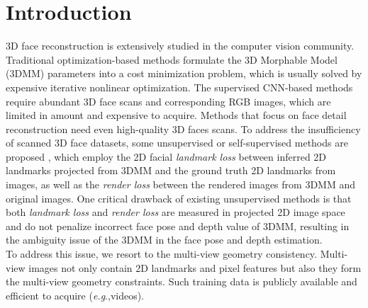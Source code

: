 \documentclass[runningheads]{llncs}
\newcommand{\eg}{\textit{e.g}.,}
\begin{document}
\section{Introduction}




3D face reconstruction is extensively studied in the computer vision community. Traditional optimization-based methods \cite{intro_relate_tra_romdhani2005estimating,intro_tra_aldrian2012inverse,intro_relate_tra_roth2015unconstrained,intro_tra_bas2016fitting, intro_tra_roth2016adaptive,intro_tra_cao2016real,intro_ava_hu2017avatar} formulate the 3D Morphable Model (3DMM) \cite{intro_3dmm_blanz1999morphable} parameters into a cost minimization problem, which is usually solved by expensive iterative nonlinear optimization.
The supervised CNN-based methods~\cite{super_syn_mul_dou2018multi,super_fit_yi2019mmface,super_fit_tran2018extreme,super_fit_volu_exp_feng2018joint,super_syn_iter_richardson20163d,super_syn_guo2018cnn,super_fiting_liu2018disentangling,super_syn_endtoend_dou2017end,super_iter_liu2016joint,super_iter_sela2017unrestricted} require abundant 3D face scans and corresponding RGB images, which are limited in amount and expensive to acquire. Methods that focus on face detail reconstruction \cite{unsuper_tran2019towards,super_chen2019photo,super_zeng2019df2net,super_review3_galteri2019deep,super_fit_tran2018extreme,super_iter_sela2017unrestricted} need even high-quality 3D faces scans.
To address the insufficiency of scanned 3D face datasets, some unsupervised or self-supervised methods are proposed \cite{unsuper_mul_ng2019accurate,unsuper_zhou2019dense,unsuper_yoon2019self,unsuper_mul_tewari2019fml,unsuper_tran2019towards,unsuper_genova2018unsupervised,unsuper_tewari2018self,unsuper_tran2018nonlinear,unsuper_tewari2017mofa,unsuper_richardson2017learning}, which employ the 2D facial \emph{landmark loss} between inferred 2D landmarks projected from 3DMM and the ground truth 2D landmarks from images, as well as the \emph{render loss} between the rendered images from 3DMM and original images. 
One critical drawback of existing unsupervised methods is that both \emph{landmark loss} and \emph{render loss} are measured in projected 2D image space and do not penalize incorrect face pose and depth value of 3DMM, resulting in the ambiguity issue of the 3DMM in the face pose and depth estimation. \\
\indent To address this issue, we resort to the multi-view geometry consistency. 
Multi-view images not only contain 2D landmarks and pixel features but also they form the multi-view geometry constraints. Such training data is publicly available and efficient to acquire (\eg videos).
\end{document}

